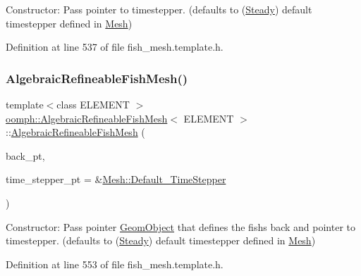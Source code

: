 Constructor\+: Pass pointer to timestepper. (defaults to (\hyperlink{classoomph_1_1Steady}{Steady}) default timestepper defined in \hyperlink{classoomph_1_1Mesh}{Mesh}) 

Definition at line 537 of file fish\+\_\+mesh.\+template.\+h.

\mbox{\label{classoomph_1_1AlgebraicRefineableFishMesh_a04f6b6114c70638b4f26ac6b70f5c0fe}} 
\subsubsection{\texorpdfstring{Algebraic\+Refineable\+Fish\+Mesh()}{AlgebraicRefineableFishMesh()}\hspace{0.1cm}{\footnotesize\ttfamily [2/2]}}
{\footnotesize\ttfamily template$<$class E\+L\+E\+M\+E\+NT $>$ \\
\hyperlink{classoomph_1_1AlgebraicRefineableFishMesh}{oomph\+::\+Algebraic\+Refineable\+Fish\+Mesh}$<$ E\+L\+E\+M\+E\+NT $>$\+::\hyperlink{classoomph_1_1AlgebraicRefineableFishMesh}{Algebraic\+Refineable\+Fish\+Mesh} (\begin{DoxyParamCaption}\item[{\hyperlink{classoomph_1_1GeomObject}{Geom\+Object} $\ast$}]{back\+\_\+pt,  }\item[{\hyperlink{classoomph_1_1TimeStepper}{Time\+Stepper} $\ast$}]{time\+\_\+stepper\+\_\+pt = {\ttfamily \&\hyperlink{classoomph_1_1Mesh_a12243d0fee2b1fcee729ee5a4777ea10}{Mesh\+::\+Default\+\_\+\+Time\+Stepper}} }\end{DoxyParamCaption})\hspace{0.3cm}{\ttfamily [inline]}}



Constructor\+: Pass pointer \hyperlink{classoomph_1_1GeomObject}{Geom\+Object} that defines the fish\textquotesingle{}s back and pointer to timestepper. (defaults to (\hyperlink{classoomph_1_1Steady}{Steady}) default timestepper defined in \hyperlink{classoomph_1_1Mesh}{Mesh}) 



Definition at line 553 of file fish\+\_\+mesh.\+template.\+h.

